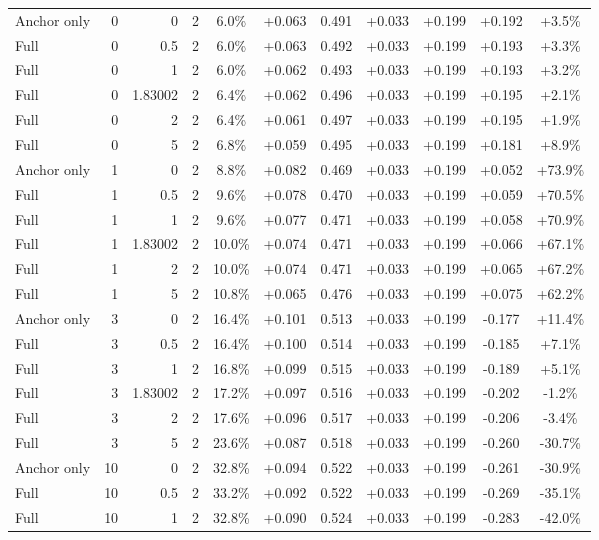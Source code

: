 \begin{table}[htbp]
\begin{tabular}{lrrrccccccc}
Anchor only & 0 & 0 & 2 & 6.0\% & +0.063 & 0.491 & +0.033 & +0.199 & +0.192 & +3.5\% \\
Full & 0 & 0.5 & 2 & 6.0\% & +0.063 & 0.492 & +0.033 & +0.199 & +0.193 & +3.3\% \\
Full & 0 & 1 & 2 & 6.0\% & +0.062 & 0.493 & +0.033 & +0.199 & +0.193 & +3.2\% \\
Full & 0 & 1.83002 & 2 & 6.4\% & +0.062 & 0.496 & +0.033 & +0.199 & +0.195 & +2.1\% \\
Full & 0 & 2 & 2 & 6.4\% & +0.061 & 0.497 & +0.033 & +0.199 & +0.195 & +1.9\% \\
Full & 0 & 5 & 2 & 6.8\% & +0.059 & 0.495 & +0.033 & +0.199 & +0.181 & +8.9\% \\
Anchor only & 1 & 0 & 2 & 8.8\% & +0.082 & 0.469 & +0.033 & +0.199 & +0.052 & +73.9\% \\
Full & 1 & 0.5 & 2 & 9.6\% & +0.078 & 0.470 & +0.033 & +0.199 & +0.059 & +70.5\% \\
Full & 1 & 1 & 2 & 9.6\% & +0.077 & 0.471 & +0.033 & +0.199 & +0.058 & +70.9\% \\
Full & 1 & 1.83002 & 2 & 10.0\% & +0.074 & 0.471 & +0.033 & +0.199 & +0.066 & +67.1\% \\
Full & 1 & 2 & 2 & 10.0\% & +0.074 & 0.471 & +0.033 & +0.199 & +0.065 & +67.2\% \\
Full & 1 & 5 & 2 & 10.8\% & +0.065 & 0.476 & +0.033 & +0.199 & +0.075 & +62.2\% \\
Anchor only & 3 & 0 & 2 & 16.4\% & +0.101 & 0.513 & +0.033 & +0.199 & -0.177 & +11.4\% \\
Full & 3 & 0.5 & 2 & 16.4\% & +0.100 & 0.514 & +0.033 & +0.199 & -0.185 & +7.1\% \\
Full & 3 & 1 & 2 & 16.8\% & +0.099 & 0.515 & +0.033 & +0.199 & -0.189 & +5.1\% \\
Full & 3 & 1.83002 & 2 & 17.2\% & +0.097 & 0.516 & +0.033 & +0.199 & -0.202 & -1.2\% \\
Full & 3 & 2 & 2 & 17.6\% & +0.096 & 0.517 & +0.033 & +0.199 & -0.206 & -3.4\% \\
Full & 3 & 5 & 2 & 23.6\% & +0.087 & 0.518 & +0.033 & +0.199 & -0.260 & -30.7\% \\
Anchor only & 10 & 0 & 2 & 32.8\% & +0.094 & 0.522 & +0.033 & +0.199 & -0.261 & -30.9\% \\
Full & 10 & 0.5 & 2 & 33.2\% & +0.092 & 0.522 & +0.033 & +0.199 & -0.269 & -35.1\% \\
Full & 10 & 1 & 2 & 32.8\% & +0.090 & 0.524 & +0.033 & +0.199 & -0.283 & -42.0\% \\

\end{tabular}
\end{table}
